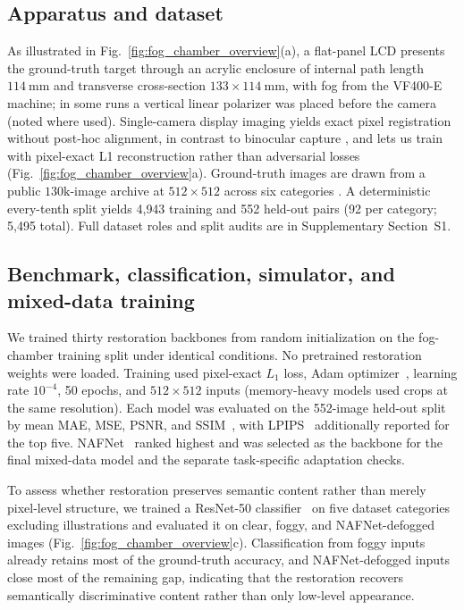 \documentclass{optica-article}
\begin{document}
\subsection{Apparatus and dataset}
\label{subsec:apparatus}
 
As illustrated in Fig.~\ref{fig:fog_chamber_overview}(a), a flat-panel LCD presents the ground-truth target through an acrylic
enclosure of internal path length $114~\mathrm{mm}$ and transverse
cross-section $133 \times 114~\mathrm{mm}$, with fog from the VF400-E
machine; in some runs a vertical linear polarizer was placed before
the camera (noted where used). Single-camera display imaging yields
exact pixel registration without post-hoc alignment, in contrast to
binocular capture \cite{pollak2024stereofog}, and lets us train with
pixel-exact L1 reconstruction rather than adversarial losses (Fig.~\ref{fig:fog_chamber_overview}a).
Ground-truth images are drawn from a public $130\mathrm{k}$-image
archive at $512 \times 512$ across six categories \cite{singh130kimages}.
A deterministic every-tenth split yields 4{,}943 training and 552
held-out pairs (92 per category; 5{,}495 total). Full dataset roles
and split audits are in Supplementary Section~S1.
 
\subsection{Benchmark, classification, simulator, and mixed-data training}
\label{sec:methods-benchmark}
We trained thirty restoration backbones from random initialization on
the fog-chamber training split under identical conditions. No pretrained
restoration weights were loaded. Training used pixel-exact $L_1$ loss, Adam
optimizer~\cite{kingma2015adam}, learning rate $10^{-4}$, 50 epochs,
and $512\times512$ inputs (memory-heavy models used crops at the
same resolution). Each model was evaluated on the 552-image held-out
split by mean MAE, MSE, PSNR, and SSIM~\cite{wang2004ssim}, with
LPIPS~\cite{zhang2018lpips} additionally reported for the top five.
NAFNet~\cite{chen2022simple} ranked highest and was selected as the
backbone for the final mixed-data model and the separate
task-specific adaptation checks.

To assess whether restoration preserves semantic content rather than
merely pixel-level structure, we trained a ResNet-50
classifier~\cite{he2016deep} on five dataset categories excluding illustrations and
evaluated it on clear, foggy, and NAFNet-defogged images
(Fig.~\ref{fig:fog_chamber_overview}c). Classification from foggy
inputs already retains most of the ground-truth accuracy, and
NAFNet-defogged inputs close most of the remaining gap, indicating
that the restoration recovers semantically discriminative content
rather than only low-level appearance.
\end{document}

